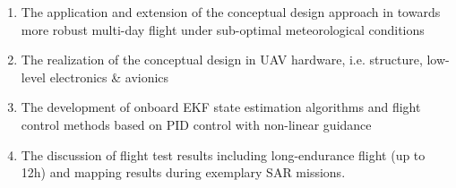  \begin{enumerate}
\item The application and extension of the conceptual design approach in \cite{Noth_PhD,Leutenegger_JIRS} towards more robust multi-day flight under sub-optimal meteorological conditions
\item The realization of the conceptual design in UAV hardware, i.e. structure, low-level electronics \& avionics 
\item The development of onboard EKF state estimation algorithms and flight control methods based on PID control with non-linear guidance
\item The discussion of flight test results including long-endurance flight (up to 12h) and mapping results during exemplary SAR missions.
\end{enumerate}

